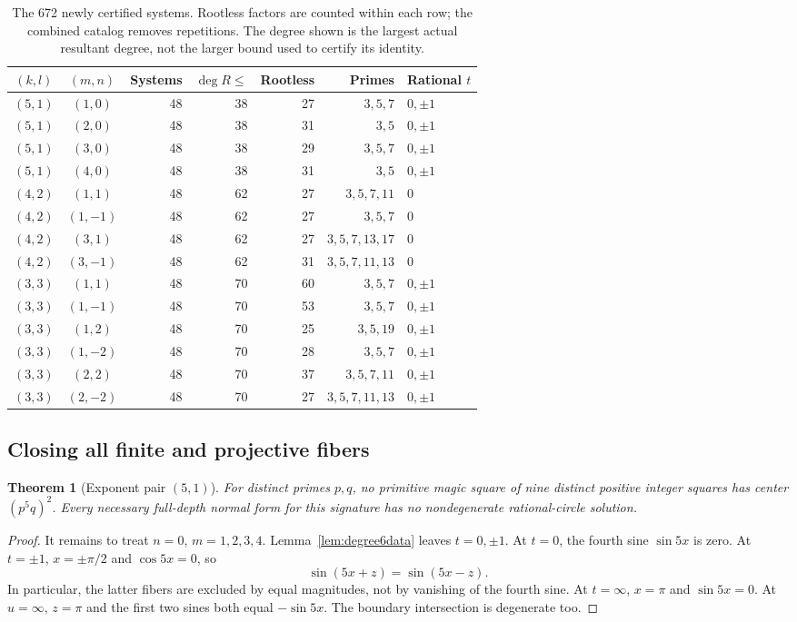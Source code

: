 \documentclass[11pt]{article}
\newtheorem{theorem}{Theorem}[section]
\theoremstyle{definition}\newtheorem{definition}[theorem]{Definition}
\theoremstyle{remark}\newtheorem{remark}[theorem]{Remark}
\begin{document}
\begin{table}[htbp]
\centering\small
\setlength{\tabcolsep}{5pt}\renewcommand{\arraystretch}{1.15}
\begin{tabular}{ccrrrrl}
\toprule
$(k,l)$ & $(m,n)$ & Systems & $\deg R\le$ & Rootless & Primes & Rational $t$\\
\midrule
$(5,1)$ & $(1,0)$ & 48 & 38 & 27 & $3,5,7$ & $0,\pm1$\\
$(5,1)$ & $(2,0)$ & 48 & 38 & 31 & $3,5$ & $0,\pm1$\\
$(5,1)$ & $(3,0)$ & 48 & 38 & 29 & $3,5,7$ & $0,\pm1$\\
$(5,1)$ & $(4,0)$ & 48 & 38 & 31 & $3,5$ & $0,\pm1$\\
$(4,2)$ & $(1,1)$ & 48 & 62 & 27 & $3,5,7,11$ & $0$\\
$(4,2)$ & $(1,-1)$ & 48 & 62 & 27 & $3,5,7$ & $0$\\
$(4,2)$ & $(3,1)$ & 48 & 62 & 27 & $3,5,7,13,17$ & $0$\\
$(4,2)$ & $(3,-1)$ & 48 & 62 & 31 & $3,5,7,11,13$ & $0$\\
$(3,3)$ & $(1,1)$ & 48 & 70 & 60 & $3,5,7$ & $0,\pm1$\\
$(3,3)$ & $(1,-1)$ & 48 & 70 & 53 & $3,5,7$ & $0,\pm1$\\
$(3,3)$ & $(1,2)$ & 48 & 70 & 25 & $3,5,19$ & $0,\pm1$\\
$(3,3)$ & $(1,-2)$ & 48 & 70 & 28 & $3,5,7$ & $0,\pm1$\\
$(3,3)$ & $(2,2)$ & 48 & 70 & 37 & $3,5,7,11$ & $0,\pm1$\\
$(3,3)$ & $(2,-2)$ & 48 & 70 & 27 & $3,5,7,11,13$ & $0,\pm1$\\
\bottomrule
\end{tabular}
\caption{The 672 newly certified systems. Rootless factors are counted within each row; the combined catalog removes repetitions. The degree shown is the largest actual resultant degree, not the larger bound used to certify its identity.}\label{tab:degree6}
\end{table}

\subsection{Closing all finite and projective fibers}
\begin{theorem}[Exponent pair $(5,1)$]\label{thm:51}
For distinct primes $p,q$, no primitive magic square of nine distinct positive integer squares has center $(p^5q)^2$. Every necessary full-depth normal form for this signature has no nondegenerate rational-circle solution.
\end{theorem}
\begin{proof}
It remains to treat $n=0$, $m=1,2,3,4$. Lemma~\ref{lem:degree6data} leaves $t=0,\pm1$. At $t=0$, the fourth sine $\sin5x$ is zero. At $t=\pm1$, $x=\pm\pi/2$ and $\cos5x=0$, so
\[
\sin(5x+z)=\sin(5x-z).
\]
In particular, the latter fibers are excluded by equal magnitudes, not by vanishing of the fourth sine. At $t=\infty$, $x=\pi$ and $\sin5x=0$. At $u=\infty$, $z=\pi$ and the first two sines both equal $-\sin5x$. The boundary intersection is degenerate too.
\end{proof}
\end{document}
